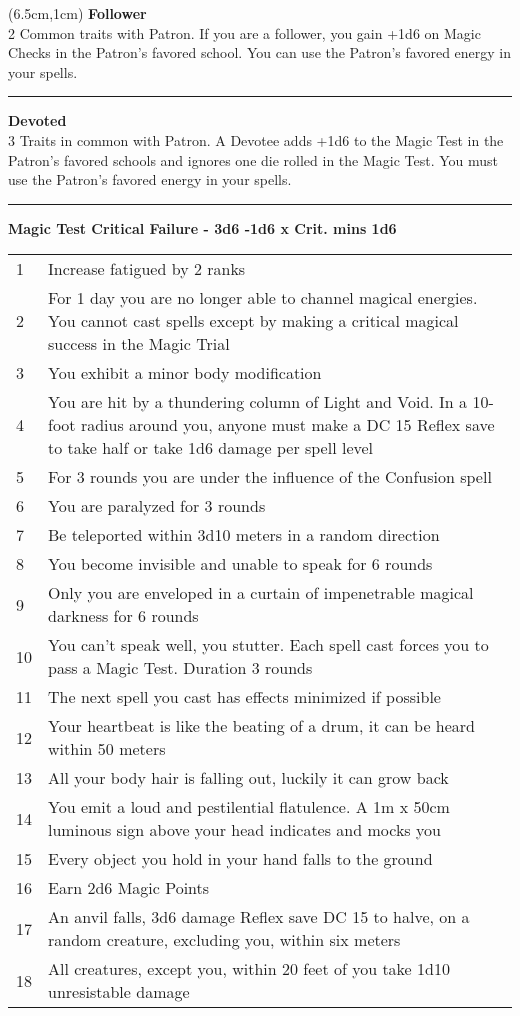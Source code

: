 \documentclass[a4paper,12 pt,openany]{book}
\newcommand{\linex}{\rule{\textwidth}{0.4pt}}
\begin{document}
\begin{textblock*}{13.5cm}(6.5cm,1cm) %
\textbf{Follower}\\
2 Common traits with Patron. If you are a follower, you gain +1d6 on Magic Checks in the Patron's favored school. You can use the Patron's favored energy in your spells.\\

\linex

\textbf{Devoted}\\
3 Traits in common with Patron. A Devotee adds +1d6 to the Magic Test in the Patron's favored schools and ignores one die rolled in the Magic Test. You must use the Patron's favored energy in your spells.

\linex

\textbf{Magic Test Critical Failure - 3d6 -1d6 x Crit. mins 1d6}
\begin{tabularx}{0.95\textwidth}{lX}
1 & Increase fatigued by 2 ranks\\
2 & For 1 day you are no longer able to channel magical energies. You cannot cast spells except by making a critical magical success in the Magic Trial\\
3 & You exhibit a minor body modification\\
4 & You are hit by a thundering column of Light and Void. In a 10-foot radius around you, anyone must make a DC 15 Reflex save to take half or take 1d6 damage per spell level\\
5 & ​​For 3 rounds you are under the influence of the Confusion spell\\
6 & You are paralyzed for 3 rounds\\
7 & Be teleported within 3d10 meters in a random direction\\
8 & You become invisible and unable to speak for 6 rounds\\
9 & Only you are enveloped in a curtain of impenetrable magical darkness for 6 rounds\\
10 & You can't speak well, you stutter. Each spell cast forces you to pass a Magic Test. Duration 3 rounds\\
11 & The next spell you cast has effects minimized if possible\\
12 & Your heartbeat is like the beating of a drum, it can be heard within 50 meters\\
13 & All your body hair is falling out, luckily it can grow back\\
14 & You emit a loud and pestilential flatulence. A 1m x 50cm luminous sign above your head indicates and mocks you\\
15 & Every object you hold in your hand falls to the ground\\
16 & Earn 2d6 Magic Points\\
17 & An anvil falls, 3d6 damage Reflex save DC 15 to halve, on a random creature, excluding you, within six meters\\
18 & All creatures, except you, within 20 feet of you take 1d10 unresistable damage
\end{tabularx}


\end{textblock*}
\end{document}
